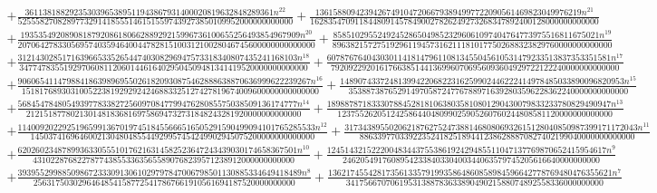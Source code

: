 \documentclass[11pt,a4paper]{article}
\theoremstyle{plain}
\theoremstyle{definition}
\begin{document}
\begin{multline*}
+ \frac{36113818829235303965389511943867931400020819632848289361 n^{22}}{52555827082897732914185551461515597439273850109952000000000000} + \frac{136158809423942674910472066793894997722090561469823049976219 n^{21}}{16283547091184480914578490027826249273268347892400128000000000000} \\
+ \frac{193535492089081879208618066288929215996736100655256493854967909 n^{20}}{2070642783305695740359464004478281510031210028046745600000000000000} + \frac{858510295524924528650498523296061097404764773975516811675021 n^{19}}{896382157275192961194573162111810177502688323829760000000000000} \\
+ \frac{312143028517163966533526544740308296947573318340807435241168103 n^{18}}{34774783551929706081120601446164029504509481341419520000000000000} + \frac{6078767640430301141814796110813455045610531479233513837353351581 n^{17}}{79209229201617663851441369960706956093604929722122240000000000000} \\
+ \frac{906065411479884186398969550261820930875462888638870636999622239267 n^{16}}{1518176893031005223819292924246883325127427819674009600000000000000} + \frac{1489074337248139942206822316259902446222414978485033890096820953 n^{15}}{353887387652914970587247767889716392803596228362240000000000000} \\
+ \frac{568454784805493977833827256097084779947628085575038509136174777 n^{14}}{21215187780213014818368169758694732731848243281920000000000000} + \frac{1898878718333078845281810638035810801290430079833233780829490947 n^{13}}{12375526205124258644048099025905260760244808581120000000000000} \\
+ \frac{1140092022925196599136701974518455666516505291590499094101765285533 n^{12}}{1450374169646002130480485544929957454249902945075200000000000000} + \frac{317343895502062187627524738814680806932615128040850987399171172043 n^{11}}{88633977033922352418251894412386288870827402199040000000000000} \\
+ \frac{620260234878993633055510176216314582523647243439030174658367501 n^{10}}{43102287682278774385533635655890768239571238912000000000000} + \frac{124514321522200483443755386192429485511047137769870652415954617 n^{9}}{2462054917608954233840330400344063579745205616640000000000} \\
+ \frac{3939552998850986723330913061029797847006798501130885334649418489 n^{8}}{25631750302964648541587725417867661910561694187520000000000} + \frac{1362174554281735613357919935864860858984596642778769480476355621 n^{7}}{3417566707061953138878363389049021588074892558336000000000} \\

\end{multline*}
\end{document}
